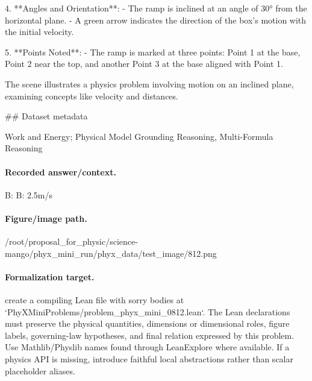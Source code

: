 4. **Angles and Orientation**:
   - The ramp is inclined at an angle of 30° from the horizontal plane.
   - A green arrow indicates the direction of the box's motion with the initial velocity.

5. **Points Noted**:
   - The ramp is marked at three points: Point 1 at the base, Point 2 near the top, and another Point 3 at the base aligned with Point 1.

The scene illustrates a physics problem involving motion on an inclined plane, examining concepts like velocity and distances.

\#\# Dataset metadata

Work and Energy; Physical Model Grounding Reasoning, Multi-Formula Reasoning

\paragraph{Recorded answer/context.}
B: B: 2.5m/s

\paragraph{Figure/image path.}
/root/proposal\_for\_physic/science-mango/phyx\_mini\_run/phyx\_data/test\_image/812.png

\paragraph{Formalization target.}
create a compiling Lean file with sorry bodies at `PhyXMiniProblems/problem\_phyx\_mini\_0812.lean`. The Lean declarations must preserve the physical quantities, dimensions or dimensional roles, figure labels, governing-law hypotheses, and final relation expressed by this problem.
Use Mathlib/Physlib names found through LeanExplore where available. If a physics API is missing, introduce faithful local abstractions rather than scalar placeholder aliases.

